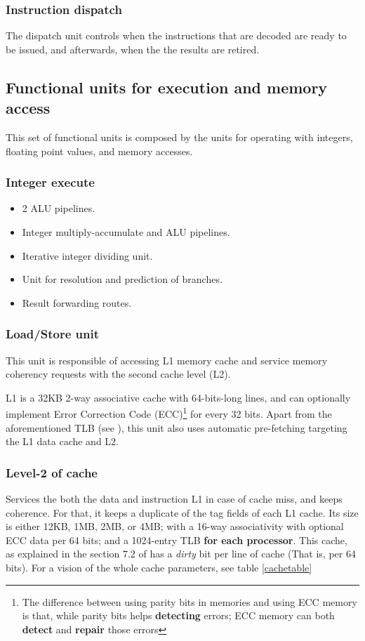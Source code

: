 \subsubsection*{Instruction dispatch}
The dispatch unit controls when the instructions that are decoded are ready to be issued, and afterwards, when the the results are retired. \cite{cortexA72manual}

\subsection*{Functional units for execution and memory access}
This set of functional units is composed by the units for operating with integers, floating point values, and memory accesses. \cite{cortexA72manual}

\subsubsection*{Integer execute}
\begin{itemize}
	\item 2 ALU pipelines.
	\item Integer multiply-accumulate and ALU pipelines.
	\item Iterative integer dividing unit.
	\item Unit for resolution and prediction of branches.
	\item Result forwarding routes.
\end{itemize}

\subsubsection*{Load/Store unit}
This unit is responsible of accessing L1 memory cache and service memory coherency requests with the second cache level (L2).

L1 is a 32KB 2-way associative cache with 64-bits-long lines, and can optionally implement Error Correction Code (ECC)\footnote{The difference between using parity bits in memories and using ECC memory is that, while parity bits helps \textbf{detecting} errors; ECC memory can both \textbf{detect} and \textbf{repair} those errors} for every 32 bits. Apart from the aforementioned TLB (see  ), this unit also uses automatic pre-fetching targeting the L1 data cache and L2. \cite{cortexA72manual}

\subsubsection*{Level-2 of cache}
Services the both the data and instruction L1 in case of cache miss, and keeps coherence. For that, it keeps a duplicate of the tag fields of each L1 cache. 
Its size is either 12KB, 1MB, 2MB, or 4MB; with a 16-way associativity with optional ECC data per 64 bits; and a 1024-entry TLB \textbf{for each processor}.
This cache, as explained in the section 7.2 of \cite{cortexA72manual} has a \textit{dirty} bit per line of cache (That is, per 64 bits). For a vision of the whole cache parameters, see table \ref{cachetable}

